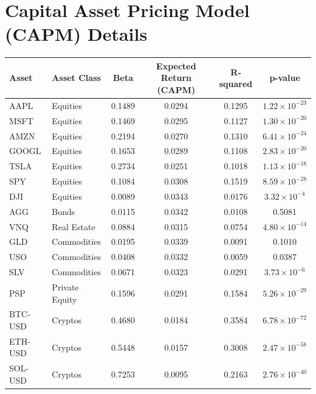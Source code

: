 \documentclass{ledger}
\begin{document}

\newpage 	

\appendix
\setcounter{section}{0}
\section{Capital Asset Pricing Model (CAPM) Details}\label{appendix:capm_details}

\vspace{12pt}

\begin{longtable}{|l|l|c|c|c|c|}
\hline
\textbf{Asset} & \textbf{Asset Class} & \textbf{Beta} & \textbf{Expected Return (CAPM)} & \textbf{R-squared} & \textbf{p-value} \\
\hline
AAPL & Equities & 0.1489 & 0.0294 & 0.1295 & $1.22 \times 10^{-23}$ \\
MSFT & Equities & 0.1469 & 0.0295 & 0.1127 & $1.30 \times 10^{-20}$ \\
AMZN & Equities & 0.2194 & 0.0270 & 0.1310 & $6.41 \times 10^{-24}$ \\
GOOGL & Equities & 0.1653 & 0.0289 & 0.1108 & $2.83 \times 10^{-20}$ \\
TSLA & Equities & 0.2734 & 0.0251 & 0.1018 & $1.13 \times 10^{-18}$ \\
SPY & Equities & 0.1084 & 0.0308 & 0.1519 & $8.59 \times 10^{-28}$ \\
DJI & Equities & 0.0089 & 0.0343 & 0.0176 & $3.32 \times 10^{-4}$ \\
AGG & Bonds & 0.0115 & 0.0342 & 0.0108 & 0.5081 \\
VNQ & Real Estate & 0.0884 & 0.0315 & 0.0754 & $4.80 \times 10^{-14}$ \\
GLD & Commodities & 0.0195 & 0.0339 & 0.0091 & 0.1010 \\
USO & Commodities & 0.0408 & 0.0332 & 0.0059 & 0.0387 \\
SLV & Commodities & 0.0671 & 0.0323 & 0.0291 & $3.73 \times 10^{-6}$ \\
PSP & Private Equity & 0.1596 & 0.0291 & 0.1584 & $5.26 \times 10^{-29}$ \\
BTC-USD & Cryptos & 0.4680 & 0.0184 & 0.3584 & $6.78 \times 10^{-72}$ \\
ETH-USD & Cryptos & 0.5448 & 0.0157 & 0.3008 & $2.47 \times 10^{-58}$ \\
SOL-USD & Cryptos & 0.7253 & 0.0095 & 0.2163 & $2.76 \times 10^{-40}$ \\

\end{longtable}
\end{document}
